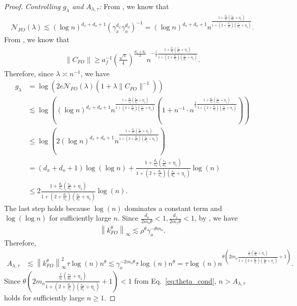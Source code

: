 \documentclass[11pt]{article}
\newcommand{\calN}{\mathcal{N}}
\newcommand{\0}{\mathbf{0}}
\begin{document}
\begin{appendix}
\begin{proof}
\textit{Controlling $g_{\lambda}$ and $A_{\lambda,\tau}$:  } 
From , we know that
\begin{align*}
    \calN_{FO}(\lambda) \lesssim (\log n)^{d_x+d_o+1} \left(\gamma_x^{d_x}\gamma_o^{d_o}\right)^{-1} = (\log n)^{d_x+d_o+1} n^{\frac{1+\frac{d_o}{s_o}(\frac{s_x}{d_x}+\eta_1)}{1+(2+\frac{d_o}{s_o})(\frac{s_x}{d_x}+\eta_1)}} .
\end{align*}
From , we know that
\begin{align*}
    \|C_{FO}\| \geq a_f^{-1}\left(\frac{\sqrt{\pi}}{4}\right)^{\frac{d_x+d_o}{2}} n^{-\frac{1}{2}\frac{1+\frac{d_o}{s_o}(\frac{s_x}{d_x}+\eta_1)}{1+(2+\frac{d_o}{s_o})(\frac{s_x}{d_x}+\eta_1)}} .
\end{align*}
Therefore, since $\lambda \asymp n^{-1}$, we have
\begin{align*}
    g_{\lambda } &= \log\left(2e\calN_{FO}(\lambda) \left(1 + \lambda \|C_{FO}\|^{-1} \right) \right) \\
    &\lesssim \log\left((\log n)^{d_x+d_o+1} n^{\frac{1+\frac{d_o}{s_o}(\frac{s_x}{d_x}+\eta_1)}{1+(2+\frac{d_o}{s_o})(\frac{s_x}{d_x}+\eta_1)}} \left(1 + n^{-1} \cdot n^{\frac{1}{2}\frac{1+\frac{d_o}{s_o}(\frac{s_x}{d_x}+\eta_1)}{1+(2+\frac{d_o}{s_o})(\frac{s_x}{d_x}+\eta_1)} }\right)\right)\\
    &\leq \log\left(2(\log n)^{d_x+d_o+1} n^{\frac{1+\frac{d_o}{s_o}(\frac{s_x}{d_x}+\eta_1)}{1+(2+\frac{d_o}{s_o})(\frac{s_x}{d_x}+\eta_1)}} \right)\\
    &= (d_x + d_o + 1)\log(\log n) + \frac{1+\frac{d_o}{s_o}(\frac{s_x}{d_x}+\eta_1)}{1+(2+\frac{d_o}{s_o})(\frac{s_x}{d_x}+\eta_1)} \log(n)\\
    &\leq 2\frac{1+\frac{d_o}{s_o}(\frac{s_x}{d_x}+\eta_1)}{1+(2+\frac{d_o}{s_o})(\frac{s_x}{d_x}+\eta_1)}\log(n).
\end{align*}
The last step holds because $\log(n)$ dominates a constant term and $\log(\log n)$ for sufficiently large $n$. Since $\frac{d_o}{2m_o\theta}<1, \frac{d_z}{2m_z\theta}<1$, by , we have
\begin{align}
    \left\|k_{FO}^{\theta}\right\|_{\infty} \lesssim \rho^{\theta}\gamma_o^{-\theta m_o}\label{eq: kfo_bound}.
\end{align}
Therefore, 
\begin{align}\label{eq:n_large_than_A}
    A_{\lambda,\tau} &\lesssim \left\|k_{FO}^{\theta}\right\|_{\infty}^2\tau \log(n)n^{\theta} \lesssim \gamma_o^{-2m_o\theta}\tau \log(n)n^{\theta} = \tau \log(n) n^{\theta\left( 2m_o\frac{\frac{1}{s_o}(\frac{s_x}{d_x}+\eta_1)}{1+(2+\frac{d_o}{s_o})(\frac{s_x}{d_x}+\eta_1)} + 1\right)}.
\end{align}
Since $\theta ( 2m_o\frac{\frac{1}{s_o}(\frac{s_x}{d_x}+\eta_1)}{1+(2+\frac{d_o}{s_o})(\frac{s_x}{d_x}+\eta_1)} + 1) < 1$ from Eq.~\eqref{eq:theta_cond}, $n>  A_{\lambda,\tau}$ holds for sufficiently large $n \geq 1$. 


\end{proof}
\end{appendix}
\end{document}

